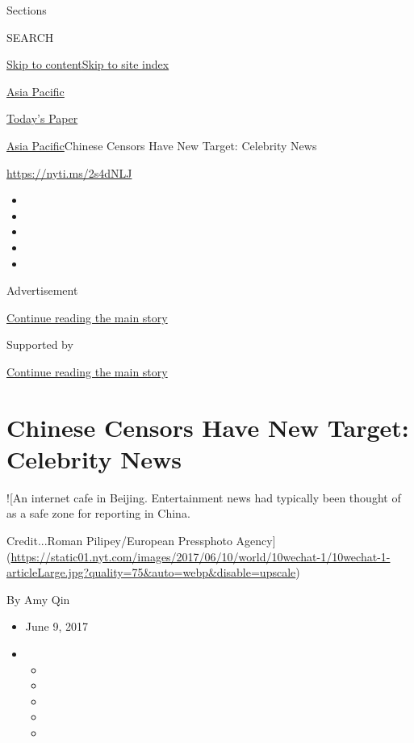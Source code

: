 Sections

SEARCH

\protect\hyperlink{site-content}{Skip to
content}\protect\hyperlink{site-index}{Skip to site index}

\href{https://www.nytimes.com/section/world/asia}{Asia Pacific}

\href{https://myaccount.nytimes.com/auth/login?response_type=cookie\&client_id=vi}{}

\href{https://www.nytimes.com/section/todayspaper}{Today's Paper}

\href{/section/world/asia}{Asia Pacific}\textbar{}Chinese Censors Have
New Target: Celebrity News

\url{https://nyti.ms/2s4dNLJ}

\begin{itemize}
\item
\item
\item
\item
\item
\end{itemize}

Advertisement

\protect\hyperlink{after-top}{Continue reading the main story}

Supported by

\protect\hyperlink{after-sponsor}{Continue reading the main story}

\hypertarget{chinese-censors-have-new-target-celebrity-news}{%
\section{Chinese Censors Have New Target: Celebrity
News}\label{chinese-censors-have-new-target-celebrity-news}}

!{[}An internet cafe in Beijing. Entertainment news had typically been
thought of as a safe zone for reporting in China.

Credit...Roman Pilipey/European Pressphoto
Agency{]}(\url{https://static01.nyt.com/images/2017/06/10/world/10wechat-1/10wechat-1-articleLarge.jpg?quality=75\&auto=webp\&disable=upscale})

By Amy Qin

\begin{itemize}
\item
  June 9, 2017
\item
  \begin{itemize}
  \item
  \item
  \item
  \item
  \item
  \end{itemize}
\end{itemize}

